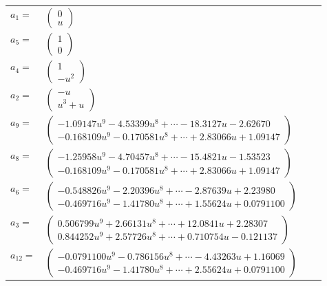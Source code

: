 \documentclass[1p]{elsarticle_modified}
\theoremstyle{definition}
\begin{document}
\begin{tabular}{m{7pt} m{180pt} m{7pt} m{180pt} }
\flushright $a_{1}=$&$\begin{pmatrix}0\\u\end{pmatrix}$ \\
\flushright $a_{5}=$&$\begin{pmatrix}1\\0\end{pmatrix}$ \\
\flushright $a_{4}=$&$\begin{pmatrix}1\\- u^2\end{pmatrix}$ \\
\flushright $a_{2}=$&$\begin{pmatrix}- u\\u^3+u\end{pmatrix}$ \\
\flushright $a_{9}=$&$\begin{pmatrix}-1.09147 u^{9}-4.53399 u^{8}+\cdots-18.3127 u-2.62670\\-0.168109 u^{9}-0.170581 u^{8}+\cdots+2.83066 u+1.09147\end{pmatrix}$ \\
\flushright $a_{8}=$&$\begin{pmatrix}-1.25958 u^{9}-4.70457 u^{8}+\cdots-15.4821 u-1.53523\\-0.168109 u^{9}-0.170581 u^{8}+\cdots+2.83066 u+1.09147\end{pmatrix}$ \\
\flushright $a_{6}=$&$\begin{pmatrix}-0.548826 u^{9}-2.20396 u^{8}+\cdots-2.87639 u+2.23980\\-0.469716 u^{9}-1.41780 u^{8}+\cdots+1.55624 u+0.0791100\end{pmatrix}$ \\
\flushright $a_{3}=$&$\begin{pmatrix}0.506799 u^{9}+2.66131 u^{8}+\cdots+12.0841 u+2.28307\\0.844252 u^{9}+2.57726 u^{8}+\cdots+0.710754 u-0.121137\end{pmatrix}$ \\
\flushright $a_{12}=$&$\begin{pmatrix}-0.0791100 u^{9}-0.786156 u^{8}+\cdots-4.43263 u+1.16069\\-0.469716 u^{9}-1.41780 u^{8}+\cdots+2.55624 u+0.0791100\end{pmatrix}$ \\

\end{tabular}
\end{document}
